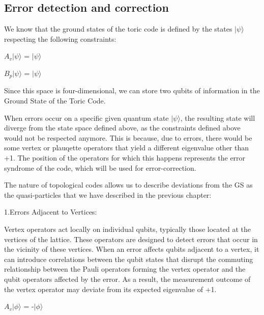 \documentclass{Configuration_Files/PoliMi3i_thesis}
\begin{document}
\subsection{Error detection and correction}

We know that the ground states of the toric code is defined by the states $|\psi\rangle $ respecting the following constraints: 

\begin{center}
	$A_v|\psi\rangle $ = $|\psi\rangle $ 
\end{center}
\begin{center}
	$B_p|\psi\rangle $ = $|\psi\rangle $ 
\end{center}

Since this space is four-dimensional, we can store two qubits of information in the Ground State of the Toric Code. \newline

When errors occur on a specific given quantum state $|\psi\rangle$, the resulting state will diverge from the state space defined above, as the constraints defined above would not be respected anymore. This is because, due to errors, there would be some vertex or plauqette operators that yield a different eigenvalue other than +1.
The position of the operators for which this happens represents the error syndrome of the code, which will be used for error-correction. \newline

The nature of topological codes allows us to describe deviations from the GS as the quasi-particles that we have described in the previous chapter: \newline

1.Errors Adjacent to Vertices:

Vertex operators act locally on individual qubits, typically those located at the vertices of the lattice. These operators are designed to detect errors that occur in the vicinity of these vertices.
When an error affects qubits adjacent to a vertex, it can introduce correlations between the qubit states that disrupt the commuting relationship between the Pauli operators forming the vertex operator and the qubit operators affected by the error.
As a result, the measurement outcome of the vertex operator may deviate from its expected eigenvalue of +1. 

\begin{center}
	$A_v|\phi\rangle $ = -$|\phi\rangle $ 
\end{center}
\end{document}
